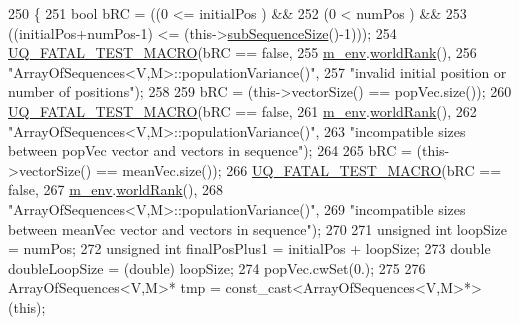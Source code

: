 \begin{DoxyCode}
250 \{
251   \textcolor{keywordtype}{bool} bRC = ((0                     <= initialPos                 ) &&
252               (0                     <  numPos                     ) &&
253               ((initialPos+numPos-1) <= (this->\hyperlink{class_q_u_e_s_o_1_1_array_of_sequences_a007d00d2398007b9bac82ed23eedb1e2}{subSequenceSize}()-1)));
254   \hyperlink{_defines_8h_a56d63d18d0a6d45757de47fcc06f574d}{UQ\_FATAL\_TEST\_MACRO}(bRC == \textcolor{keyword}{false},
255                       \hyperlink{class_q_u_e_s_o_1_1_base_vector_sequence_a8e8824d2a63c5a43bcc6473e3a0491e8}{m\_env}.\hyperlink{class_q_u_e_s_o_1_1_base_environment_a78b57112bbd0e6dd0e8afec00b40ffa7}{worldRank}(),
256                       \textcolor{stringliteral}{"ArrayOfSequences<V,M>::populationVariance()"},
257                       \textcolor{stringliteral}{"invalid initial position or number of positions"});
258 
259   bRC = (this->vectorSize() == popVec.size());
260   \hyperlink{_defines_8h_a56d63d18d0a6d45757de47fcc06f574d}{UQ\_FATAL\_TEST\_MACRO}(bRC == \textcolor{keyword}{false},
261                       \hyperlink{class_q_u_e_s_o_1_1_base_vector_sequence_a8e8824d2a63c5a43bcc6473e3a0491e8}{m\_env}.\hyperlink{class_q_u_e_s_o_1_1_base_environment_a78b57112bbd0e6dd0e8afec00b40ffa7}{worldRank}(),
262                       \textcolor{stringliteral}{"ArrayOfSequences<V,M>::populationVariance()"},
263                       \textcolor{stringliteral}{"incompatible sizes between popVec vector and vectors in sequence"});
264 
265   bRC = (this->vectorSize() == meanVec.size());
266   \hyperlink{_defines_8h_a56d63d18d0a6d45757de47fcc06f574d}{UQ\_FATAL\_TEST\_MACRO}(bRC == \textcolor{keyword}{false},
267                       \hyperlink{class_q_u_e_s_o_1_1_base_vector_sequence_a8e8824d2a63c5a43bcc6473e3a0491e8}{m\_env}.\hyperlink{class_q_u_e_s_o_1_1_base_environment_a78b57112bbd0e6dd0e8afec00b40ffa7}{worldRank}(),
268                       \textcolor{stringliteral}{"ArrayOfSequences<V,M>::populationVariance()"},
269                       \textcolor{stringliteral}{"incompatible sizes between meanVec vector and vectors in sequence"});
270 
271   \textcolor{keywordtype}{unsigned} \textcolor{keywordtype}{int} loopSize      = numPos;
272   \textcolor{keywordtype}{unsigned} \textcolor{keywordtype}{int} finalPosPlus1 = initialPos + loopSize;
273   \textcolor{keywordtype}{double} doubleLoopSize = (double) loopSize;
274   popVec.cwSet(0.);
275 
276   ArrayOfSequences<V,M>* tmp = \textcolor{keyword}{const\_cast<}ArrayOfSequences<V,M>*\textcolor{keyword}{>}(\textcolor{keyword}{this});

\end{DoxyCode}
